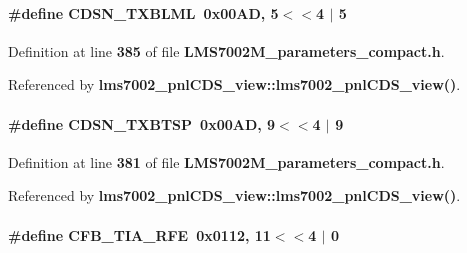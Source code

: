 \paragraph[{C\+D\+S\+N\+\_\+\+T\+X\+B\+L\+ML}]{\setlength{\rightskip}{0pt plus 5cm}\#define C\+D\+S\+N\+\_\+\+T\+X\+B\+L\+ML~0x00\+A\+D, 5$<$$<$4 $\vert$  5}\label{LMS7002M__parameters__compact_8h_ab80194969ef82805b6043e911bad9c76}


Definition at line {\bf 385} of file {\bf L\+M\+S7002\+M\+\_\+parameters\+\_\+compact.\+h}.



Referenced by {\bf lms7002\+\_\+pnl\+C\+D\+S\+\_\+view\+::lms7002\+\_\+pnl\+C\+D\+S\+\_\+view()}.

\paragraph[{C\+D\+S\+N\+\_\+\+T\+X\+B\+T\+SP}]{\setlength{\rightskip}{0pt plus 5cm}\#define C\+D\+S\+N\+\_\+\+T\+X\+B\+T\+SP~0x00\+A\+D, 9$<$$<$4 $\vert$  9}\label{LMS7002M__parameters__compact_8h_a9198bc89532b9eeb43ce390ab2e60244}


Definition at line {\bf 381} of file {\bf L\+M\+S7002\+M\+\_\+parameters\+\_\+compact.\+h}.



Referenced by {\bf lms7002\+\_\+pnl\+C\+D\+S\+\_\+view\+::lms7002\+\_\+pnl\+C\+D\+S\+\_\+view()}.

\paragraph[{C\+F\+B\+\_\+\+T\+I\+A\+\_\+\+R\+FE}]{\setlength{\rightskip}{0pt plus 5cm}\#define C\+F\+B\+\_\+\+T\+I\+A\+\_\+\+R\+FE~0x0112, 11$<$$<$4 $\vert$  0}\label{LMS7002M__parameters__compact_8h_af4b8c8f5c97de64f722617c21d82f149}


